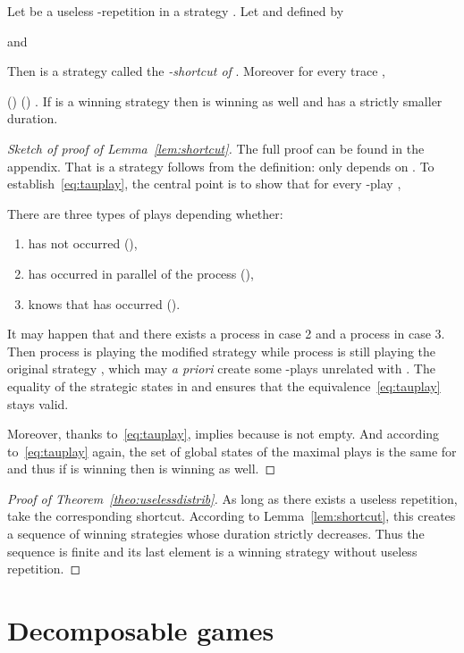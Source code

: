 \documentclass[a4paper,UKenglish]{lipics-v2016}
\newcommand{\be}{}
\begin{document}
\begin{lemma}
\label{lem:shortcut}
Let  be a  useless -repetition in a  strategy .
Let  and  defined by

and

Then  is a strategy
called the \emph{-shortcut of }.
Moreover
for every trace ,
\be
\label{eq:tauplay}
()
\iff 
()
\enspace.
\ee
If  is a winning strategy then  is winning as well and has a strictly smaller duration.
\end{lemma}
\begin{proof}[Sketch of proof of Lemma~\ref{lem:shortcut}]
The full proof can be found in the appendix.
That  is a strategy follows from the definition:  only depends on . To establish~\eqref{eq:tauplay},
the central point is to show that for every -play ,

There are three types of plays depending whether:
\begin{enumerate}
\item
 has not occurred  (),
\item
 has occurred in parallel of the process 
(),
\item
 knows that
 has occurred
().
\end{enumerate}
It may happen that  and
there exists a process  in case 2 and a process  in case 3. Then process  is playing the modified strategy
 while process  is still playing the original strategy , which may \emph{a priori} create some -plays unrelated with .
The equality of the strategic states in  and  ensures that the equivalence~\eqref{eq:tauplay} stays valid.

Moreover, thanks to~\eqref{eq:tauplay},
 implies  because  is not empty.
And according to~\eqref{eq:tauplay} again,
the set of global states of the maximal plays is the same for  and  thus if  is winning then  is winning as well.
\end{proof}

\begin{proof}[Proof of Theorem~\ref{theo:uselessdistrib}]
As long as there exists a useless repetition,
take the corresponding shortcut.
According to Lemma~\ref{lem:shortcut},
this creates a sequence 
of winning strategies whose duration strictly decreases. Thus the sequence is finite and its last element
is a winning strategy without useless repetition.
\end{proof}



\section{Decomposable games}
\label{sec:decomposable}
\end{document}
